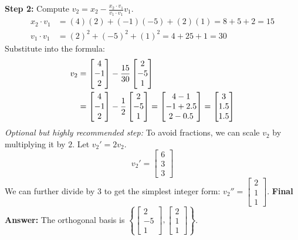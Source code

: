 \documentclass[11pt, letterpaper]{article}
\theoremstyle{definition}
\theoremstyle{remark}
\begin{document}
\textbf{Step 2:} Compute $v_2 = x_2 - \frac{x_2 \cdot v_1}{v_1 \cdot v_1}v_1$.
\begin{align*}
    x_2 \cdot v_1 &= (4)(2) + (-1)(-5) + (2)(1) = 8 + 5 + 2 = 15 \\
    v_1 \cdot v_1 &= (2)^2 + (-5)^2 + (1)^2 = 4 + 25 + 1 = 30
\end{align*}
Substitute into the formula:
\begin{align*}
    v_2 &= \begin{bmatrix} 4 \\ -1 \\ 2 \end{bmatrix} - \frac{15}{30} \begin{bmatrix} 2 \\ -5 \\ 1 \end{bmatrix} \\ \relax
    &= \begin{bmatrix} 4 \\ -1 \\ 2 \end{bmatrix} - \frac{1}{2} \begin{bmatrix} 2 \\ -5 \\ 1 \end{bmatrix} = \begin{bmatrix} 4 - 1 \\ -1 + 2.5 \\ 2 - 0.5 \end{bmatrix} = \begin{bmatrix} 3 \\ 1.5 \\ 1.5 \end{bmatrix}
\end{align*}
\textit{Optional but highly recommended step:} To avoid fractions, we can scale $v_2$ by multiplying it by $2$. Let $v_2' = 2v_2$.
\[ v_2' = \begin{bmatrix} 6 \\ 3 \\ 3 \end{bmatrix} \]
We can further divide by $3$ to get the simplest integer form: $v_2'' = \begin{bmatrix} 2 \\ 1 \\ 1 \end{bmatrix}$.
\textbf{Final Answer:} The orthogonal basis is $\left\{ \begin{bmatrix} 2 \\ -5 \\ 1 \end{bmatrix}, \begin{bmatrix} 2 \\ 1 \\ 1 \end{bmatrix} \right\}$.
\end{document}
